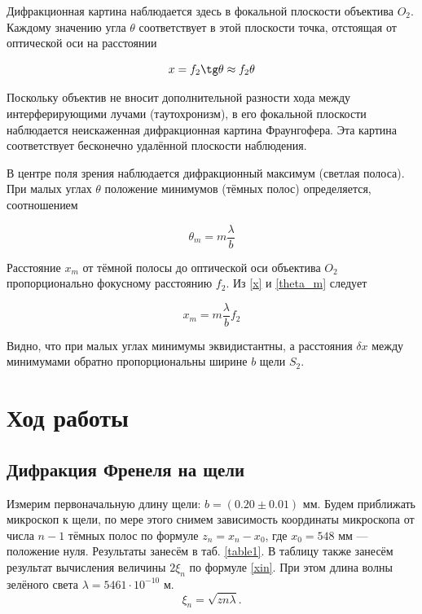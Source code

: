 \documentclass[a4paper,12pt]{article}
\theoremstyle{definition}
\begin{document}
Дифракционная картина наблюдается здесь в фокальной плоскости
объектива $ O_2 $. Каждому значению угла $ \theta $ соответствует в этой плоскости точка, отстоящая от оптической оси на расстоянии

\begin{equation}\label{x}
x = f_2 \tg \theta \approx f_2 \theta
\end{equation}

Поскольку объектив не вносит дополнительной разности хода
между интерферирующими лучами (таутохронизм), в его фокальной
плоскости наблюдается неискаженная дифракционная картина Фраунгофера. Эта картина соответствует бесконечно удалённой плоскости
наблюдения.

В центре поля зрения наблюдается дифракционный максимум (светлая полоса). При малых углах $ \theta $ положение минимумов (тёмных полос)
определяется, соотношением

\begin{equation}\label{theta_m}
\theta_m = m \dfrac{\lambda}{b}
\end{equation}

Расстояние $ x_m $ от тёмной полосы до оптической оси объектива $ O_2 $ пропорционально фокусному расстоянию $ f_2 $. Из \eqref{x} и \eqref{theta_m} следует 

\begin{equation}\label{xm}
x_m = m \dfrac{\lambda}{b} f_2
\end{equation}

Видно, что при малых углах минимумы эквидистантны, а расстояния $ \delta x $ между минимумами обратно пропорциональны ширине $ b $ щели $ S_2 $.


\section{Ход работы}
\subsection{Дифракция Френеля на щели}
Измерим первоначальную длину щели: $ b = (0.20 \pm 0.01)$ мм. Будем приближать микроскоп к щели, по мере этого снимем зависимость координаты микроскопа от числа $ n - 1 $ тёмных полос по формуле $ z_n = x_n - x_0 $, где $ x_0 = 548 $ мм --- положение нуля. Результаты занесём в таб. \ref{table1}. В таблицу также занесём результат вычисления величины $ 2\xi_n $ по формуле \eqref{xin}. При этом длина волны зелёного света $ \lambda = 5461 \cdot 10^{-10} $ м. 
\begin{equation}
\xi_n = \sqrt{zn\lambda}.
\end{equation}
\end{document}
